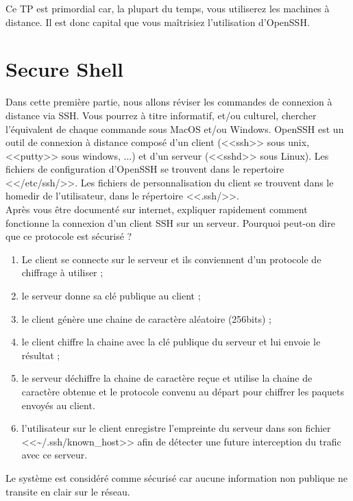 \documentclass[11pt]{article}
\newcommand{\numtd}{02}
\newcommand{\titretd}{Linux~:~Utilisation distante}
\begin{document}
	
\entete{\numtd}{\titretd}
 
\begin{introduction}
Ce TP est primordial car, la plupart du temps, vous utiliserez les machines à distance. Il est donc capital que vous maîtrisiez l'utilisation d'OpenSSH.
\end{introduction}

\section{Secure Shell}

Dans cette première partie, nous allons réviser les commandes de connexion à distance via SSH. Vous pourrez à titre
informatif, et/ou culturel, chercher l’équivalent de chaque commande sous MacOS et/ou Windows. OpenSSH est un outil de 
connexion à distance composé d’un client (<<ssh>> sous unix, <<putty>> sous windows, ...) et d’un serveur (<<sshd>> sous Linux).
Les fichiers de configuration d'OpenSSH se trouvent dans le repertoire <</etc/ssh/>>. Les fichiers de personnalisation du 
client se trouvent dans le homedir de l’utilisateur, dans le répertoire <<.ssh/>>.\\

Après vous être documenté sur internet, expliquer rapidement comment fonctionne la connexion d'un client SSH sur un serveur. Pourquoi peut-on dire que ce protocole est sécurisé ?

\begin{solution}
\begin{enumerate}
 \item Le client se connecte sur le serveur et ils conviennent d'un protocole de chiffrage à utiliser ;
 \item le serveur donne sa clé publique au client ;
 \item le client génère une chaine de caractère aléatoire (256bits) ;
 \item le client chiffre la chaine avec la clé publique du serveur et lui envoie le résultat ;
 \item le serveur déchiffre la chaine de caractère reçue et utilise la chaine de caractère obtenue et le protocole convenu au départ pour chiffrer les paquets envoyés au client.
 \item l'utilisateur sur le client enregistre l'empreinte du serveur dans son fichier <<\textasciitilde{}/.ssh/known\_host>> afin de détecter une future interception du trafic avec ce serveur.
\end{enumerate}

Le système est considéré comme sécurisé car aucune information non publique ne transite en clair sur le réseau.

\end{solution}
\end{document}
